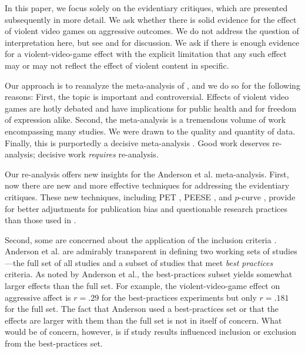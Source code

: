 \documentclass[man]{apa6}
\begin{document}
In this paper, we focus solely on the evidentiary critiques, which are presented subsequently in more detail.  We ask whether there is solid evidence for the effect of violent video games on aggressive outcomes.  We do not address the question of interpretation here, but see \citet{Elson:Ferguson:2013} and \citet{Bushman:Huesmann:2014} for discussion.   We ask if there is enough evidence for a violent-video-game effect with the explicit limitation that any such effect may or may not reflect the effect of violent content in specific.

Our approach is to reanalyze the meta-analysis of \citet{Anderson:etal:2010}, and we do so for the following reasons: 
First, the topic is important and controversial. Effects of violent video games are hotly debated and have implications for public health and for freedom of expression alike. Second, the meta-analysis is a tremendous volume of work encompassing many studies. We were drawn to the quality and quantity of data. Finally, this is purportedly a decisive meta-analysis \citep[see][]{Huesmann:2010}. Good work deserves re-analysis; decisive work {\em requires} re-analysis.

Our re-analysis offers new insights for the Anderson et al. meta-analysis. First, now there are new and more effective techniques for addressing the evidentiary critiques.  These new techniques, including PET \citep[Precision-Effect Test,][]{Stanley:Doucouliagos:2014}, PEESE \citep[Precision-Effect Estimate with Standard Error,][]{Stanley:Doucouliagos:2014}, and $p$-curve \citep{Simonsohn:etal:2014,Simonsohn:etal:2014b}, provide for better adjustments for publication bias and questionable research practices than those used in \citet{Anderson:etal:2010}. 

Second, some are concerned about the application of the inclusion criteria \citep{Elson:Ferguson:2013}. %
Anderson et al. are admirably transparent in defining two working sets of studies---the full set of all studies and a subset of studies that meet {\em best practices} criteria.  As noted by Anderson et al., the best-practices subset yields somewhat larger effects than the full set.  For example, the violent-video-game effect on aggressive affect is $r=.29$ for the best-practices experiments but only $r=.181$ for the full set. The fact that Anderson used a best-practices set or that the effects are larger with them than the full set is not in itself of concern.  What would be of concern, however, is if study results influenced inclusion or exclusion from the best-practices set.  
\end{document}
